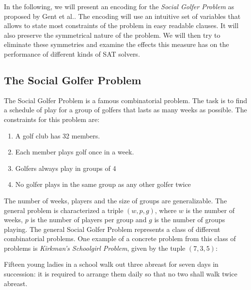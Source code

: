 \documentclass[a4paper]{scrartcl}
\begin{document}
In the following, we will present an encoding for the \emph{Social Golfer Problem} as proposed by Gent et al.\cite{Gent05}. The encoding will use an intuitive set of variables that allows to state most constraints of the problem in easy readable clauses. It will also preserve the symmetrical nature of the problem. We will then try to eliminate these symmetries and examine the effects this measure has on the performance of different kinds of SAT solvers.

\subsection{The Social Golfer Problem}

The Social Golfer Problem is a famous combinatorial problem. The task is to find a schedule of play for a group of golfers that lasts as many weeks as possible. The constraints for this problem are:

\begin{mdframed}[skipabove=\baselineskip, skipbelow=\baselineskip, leftmargin=20, rightmargin=20]

\begin{enumerate}
    \item A golf club has 32 members.
    \item Each member plays golf once in a week.
    \item Golfers always play in groups of 4
    \item No golfer plays in the same group as any other golfer twice
\end{enumerate}

\end{mdframed}

The number of weeks, players and the size of groups are generalizable. The general problem is characterized a triple $(w,p,g)$, where $w$ is the number of weeks, $p$ is the number of players per group and $g$ is the number of groups playing. The general Social Golfer Problem represents a class of different combinatorial problems. One example of a concrete problem from this class of problems is \emph{Kirkman's Schoolgirl Problem}, given by the tuple $(7,3,5)$:

\begin{mdframed}[skipabove=\baselineskip, skipbelow=\baselineskip, leftmargin=20, rightmargin=20]

Fifteen young ladies in a school walk out three abreast for seven days in succession: it is required to arrange them daily so that no two shall walk twice abreast.

\end{mdframed}
\end{document}
